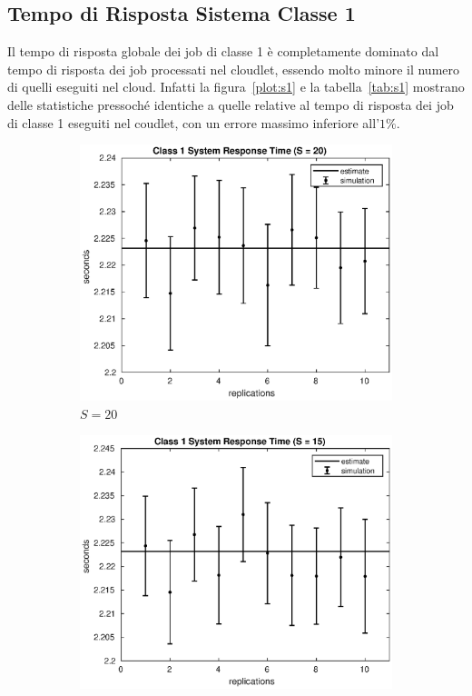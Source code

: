 \subsection{Tempo di Risposta Sistema Classe 1}
Il tempo di risposta globale dei job di classe 1 è completamente dominato dal
tempo di risposta dei job processati nel cloudlet, essendo molto minore il
numero di quelli eseguiti nel cloud. Infatti la figura~\ref{plot:s1} e la
tabella~\ref{tab:s1} mostrano delle statistiche pressoché identiche a quelle
relative al tempo di risposta dei job di classe 1 eseguiti nel coudlet, con un
errore massimo inferiore all'$1\%$.
\begin{figure}[!h]
\centering
%
\begin{subfigure}[t]{0.49\textwidth}
\includegraphics[width=\textwidth]{figures/simul/20_500K_s1}
\caption{$S = 20$}
\label{20_s1}
\end{subfigure}
%
\begin{subfigure}[t]{0.49\textwidth}
\includegraphics[width=\textwidth]{figures/simul/15_500K_s1}

\end{subfigure}
\end{figure}
